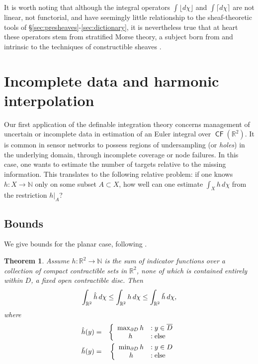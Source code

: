 \documentclass{psapm-l}
\newtheorem{theorem}{Theorem}[section]
\theoremstyle{definition}
\theoremstyle{remark}
\numberwithin{equation}{section}
\begin{document}
It is worth noting that although the integral operators $\int {{\lfloor d\chi\rfloor}}$ and $\int {{\lceil d\chi\rceil}}$ are not linear, not functorial, and have seemingly little relationship to the sheaf-theoretic tools of \S\ref{sec:presheaves}-\ref{sec:dictionary}, it is nevertheless true that at heart these operators stem from stratified Morse theory, a subject born from and intrinsic to the techniques of constructible sheaves \cite{GM,Schurmann}.

\section{Incomplete data and harmonic interpolation}
\label{sec:incomplete}

Our first application of the definable integration theory concerns management of uncertain or incomplete data in estimation of an Euler integral over ${{{\operatorname{\mathsf{{CF}}}}}}({{\mathbb R}}^2)$. It is common in sensor networks to possess regions of undersampling (or {\em holes}) in the underlying domain, through incomplete coverage or node failures. In this case, one wants to estimate the number of targets relative to the missing information. This translates to the following relative problem: if one knows $h\colon X\to{{\mathbb N}}$ only on some subset $A\subset X$, how well can one estimate $\int_X h\,d\chi$ from the restriction $h\vert_A$?

\subsection{Bounds}
\label{sec:bounds}
We give bounds for the planar case, following \cite{BG:RSS}.

\begin{theorem}
\label{thm:holes}
Assume $h\colon{{\mathbb R}}^2\to{{\mathbb N}}$ is the sum of indicator functions over a collection of compact contractible sets in ${{\mathbb R}}^2$, none of which
is contained entirely within $D$, a fixed open contractible disc. Then
\begin{equation}
\label{eq:hole}
    \int_{{{\mathbb R}}^2} \hat{h}\, d\chi
    \leq
    \int_{{{\mathbb R}}^2} h\,d\chi
    \leq
    \int_{{{\mathbb R}}^2} {\rlap{\smash{\raisebox{2.25ex}{{\raisebox{1ex}{\rotatebox{180}{{$\hat{~}\,$}}}}}}}{h}}\, d\chi ,
\end{equation}
where
\begin{eqnarray*}
    \hat{h}(y) &=& \left\{
    \begin{array}{cl}
        \max_{\partial D} h & : y\in\overline{D} \\
        h & : {\mbox{else}}
    \end{array}
    \right.
    \\
    {\rlap{\smash{\raisebox{2.25ex}{{\raisebox{1ex}{\rotatebox{180}{{$\hat{~}\,$}}}}}}}{h}}(y) &=& \left\{
    \begin{array}{cl}
        \min_{\partial D} h & : y\in D \\
        h & : {\mbox{else}}
    \end{array}
    \right.
\end{eqnarray*}
\end{theorem}
\end{document}
